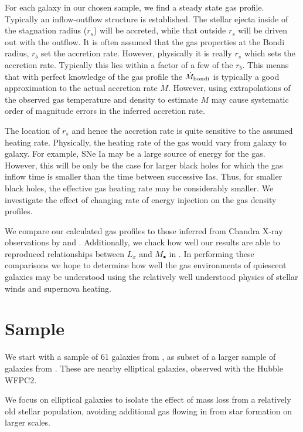 \documentclass[usenatbib,fleqn]{mn2e}
\newcommand{\Mdot}{\dot{M}}
\newcommand{\Mdotb}{\dot{M}_{\rm bondi}}
\newcommand{\rs}{r_s}
\newcommand{\rb}{r_b}
\newcommand{\Mbh}[1][]{M_{\bullet#1}}
\begin{document}
For each galaxy in our chosen sample, we find a steady state gas
profile. Typically an inflow-outflow structure is established. The
stellar ejecta inside of the stagnation radius ($\rs$) will be
accreted, while that outside $\rs$ will be driven out with the
outflow.  It is often assumed that the gas properties at the Bondi
radius, $\rb$ set the accretion rate. However, physically it is really
$\rs$ which sets the accretion rate. Typically this lies within a
factor of a few of the $\rb$.  This means that with perfect knowledge
of the gas profile the $\Mdotb$ is typically a good approximation to
the actual accretion rate $\Mdot$.  However, using extrapolations of
the observed gas temperature and density to estimate $\Mdot$ may cause
systematic order of magnitude errors in the inferred accretion rate.

The location of $\rs$ and hence the accretion rate is quite sensitive
to the assumed heating rate.  Physically, the heating rate of the gas
would vary from galaxy to galaxy. For example, SNe Ia may be a large
source of energy for the gas. However, this will be only be the case
for larger black holes for which the gas inflow time is smaller than
the time between successive Ias. Thus, for smaller black holes, the
effective gas heating rate may be considerably smaller. We
investigate the effect of changing rate of energy injection on the gas
density profiles.

We compare our calculated gas profiles to those inferred from Chandra
X-ray observations by \citealt{AllenDunn+:2006a} and
\citealt{RussellMcNamara+:2013a}. Additionally, we chack how well our
results are able to reproduced relationships between $L_x$ and $\Mbh$
in \citealt{MillerGallo+:2014a}. In performing these comparisons we
hope to determine how well the gas environments of quiescent galaxies
may be understood using the relatively well understood physics of
stellar winds and supernova heating.


\section{Sample}
We start with a sample of 61 galaxies from
, as subset of a larger sample of
galaxies from \citealt{FaberTremaine+:1997a}. These are nearby
elliptical galaxies, observed with the Hubble WFPC2.

We focus on elliptical galaxies to isolate the effect of mass loss
from a relatively old stellar population, avoiding additional gas
flowing in from star formation on larger scales.
\end{document}
